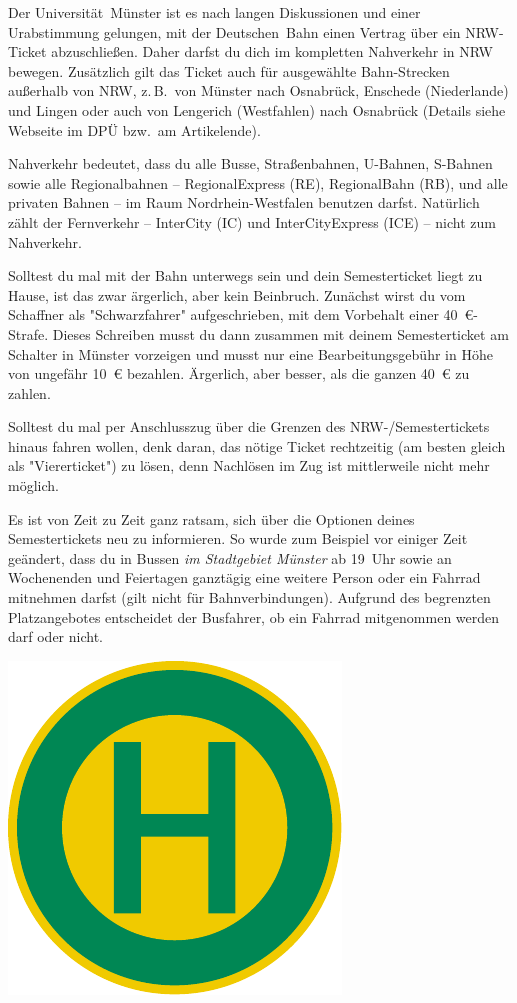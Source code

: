 \begin{multicols}{2}
Der Universität~Münster ist es nach langen Diskussionen und einer Urabstimmung gelungen, mit der Deutschen~Bahn einen Vertrag über ein NRW-Ticket abzuschließen. Daher darfst du dich im kompletten Nahverkehr in NRW bewegen. Zusätzlich gilt das Ticket auch für ausgewählte Bahn-Strecken außerhalb von NRW, z.\,B.\ von Münster nach Osnabrück, Enschede (Niederlande) und Lingen oder auch von Lengerich (Westfahlen) nach Osnabrück (Details siehe Webseite im DPÜ bzw.\ am Artikelende).

Nahverkehr bedeutet, dass du alle Busse, Straßenbahnen, U-Bahnen, S-Bahnen sowie alle Regionalbahnen -- RegionalExpress (RE), RegionalBahn (RB), und alle privaten Bahnen -- im Raum Nordrhein-Westfalen benutzen darfst. Natürlich zählt der Fernverkehr -- InterCity (IC) und InterCityExpress (ICE) -- nicht zum Nahverkehr.

Solltest du mal mit der Bahn unterwegs sein und dein Semesterticket liegt zu Hause, ist das zwar ärgerlich, aber kein Beinbruch. Zunächst wirst du vom Schaffner als "Schwarzfahrer" aufgeschrieben, mit dem Vorbehalt einer \SI{40}{\euro}-Strafe. Dieses Schreiben musst du dann zusammen mit deinem Semesterticket am Schalter in Münster vorzeigen und musst nur eine Bearbeitungsgebühr in Höhe von ungefähr \SI{10}{\euro} bezahlen. Ärgerlich, aber besser, als die ganzen \SI{40}{\euro} zu zahlen.

Solltest du mal per Anschlusszug über die Grenzen des NRW-/Semestertickets hinaus fahren wollen, denk daran, das nötige Ticket rechtzeitig (am besten gleich als "Viererticket") zu lösen, denn Nachlösen im Zug ist mittlerweile nicht mehr möglich.

Es ist von Zeit zu Zeit ganz ratsam, sich über die Optionen deines Semestertickets neu zu informieren. So wurde zum Beispiel vor einiger Zeit geändert, dass du in Bussen \emph{im Stadtgebiet Münster} ab 19~Uhr sowie an Wochenenden und Feiertagen ganztägig eine weitere Person oder ein Fahrrad mitnehmen darfst (gilt nicht für Bahnverbindungen). Aufgrund des begrenzten Platzangebotes entscheidet der Busfahrer, ob ein Fahrrad mitgenommen werden darf oder nicht.

\columnbreak

\begin{center}
	\includegraphics{res/bushaltestelle.pdf}

\end{center}
\end{multicols}
